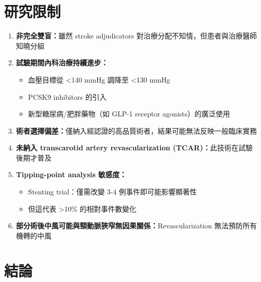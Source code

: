 \documentclass[12pt,a4paper]{article}
\begin{document}
\section{研究限制}

\begin{enumerate}
    \item \textbf{非完全雙盲：}雖然 stroke adjudicators 對治療分配不知情，但患者與治療醫師知曉分組

    \item \textbf{試驗期間內科治療持續進步：}
    \begin{itemize}
        \item 血壓目標從 <140 mmHg 調降至 <130 mmHg
        \item PCSK9 inhibitors 的引入
        \item 新型糖尿病/肥胖藥物（如 GLP-1 receptor agonists）的廣泛使用
    \end{itemize}

    \item \textbf{術者選擇偏差：}僅納入經認證的高品質術者，結果可能無法反映一般臨床實務

    \item \textbf{未納入 transcarotid artery revascularization (TCAR)：}此技術在試驗後期才普及

    \item \textbf{Tipping-point analysis 敏感度：}
    \begin{itemize}
        \item Stenting trial：僅需改變 3-4 例事件即可能影響顯著性
        \item 但這代表 >10\% 的相對事件數變化
    \end{itemize}

    \item \textbf{部分術後中風可能與頸動脈狹窄無因果關係：}Revascularization 無法預防所有機轉的中風
\end{enumerate}

\section{結論}
\end{document}
